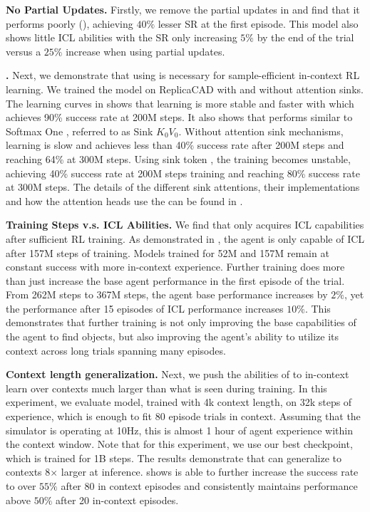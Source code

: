 \textbf{No Partial Updates.} Firstly, we remove the partial updates in \method and find that it performs poorly (), achieving $ 40 \%$ lesser SR at the first episode. This model also shows little ICL abilities with the SR only increasing $ 5 \% $ by the end of the trial versus a $ 25\%$ increase when using partial updates. 

\textbf{\sinkv.} Next, we demonstrate that using \sinkv is necessary for sample-efficient in-context RL learning. We trained the model on ReplicaCAD with and without attention sinks. The learning curves in  shows that learning is more stable and faster with \sinkv which achieves 90\% success rate at 200M steps. It also shows that \sinkv performs similar to Softmax One \citep{off_by_one_softmax}, referred to as Sink $K_0V_0$. 
Without attention sink mechanisms, learning is slow and achieves less than 40\% success rate after 200M steps and reaching 64\% at 300M steps. Using sink token \citep{xiao2023efficient}, the training becomes unstable, achieving 40\% success rate at 200M steps training and reaching 80\% success rate at 300M steps. The details of the different sink attentions, their implementations and how the attention heads use the \sinkv can be found in .

\textbf{Training Steps v.s. ICL Abilities.} We find that \method only acquires ICL capabilities after sufficient RL training. As demonstrated in , the agent is only capable of ICL after 157M steps of training. Models trained for 52M and 157M remain at constant success with more in-context experience. Further training does more than just increase the base agent performance in the first episode of the trial. 
From 262M steps to 367M steps, the agent base performance increases by $ 2\%$, yet the performance after 15 episodes of ICL performance increases $ 10 \%$.
This demonstrates that further training is not only improving the base capabilities of the agent to find objects, but also improving the agent's ability to utilize its context across long trials spanning many episodes.

\textbf{Context length generalization.} Next, we push the abilities of \method to in-context learn over contexts much larger than what is seen during training. In this experiment, we evaluate \method model, trained with 4k context length, on 32k steps of experience, which is enough to fit 80 episode trials in context. Assuming that the simulator is operating at 10Hz, this is almost 1 hour of agent experience within the context window. Note that for this experiment, we use our best checkpoint, which is trained for 1B steps. The results demonstrate that \method can generalize to contexts 8$\times$ larger at inference.  shows \method is able to further increase the success rate to over $ 55\% $ after 80 in context episodes and consistently maintains performance above $ 50 \% $ after 20 in-context episodes.


